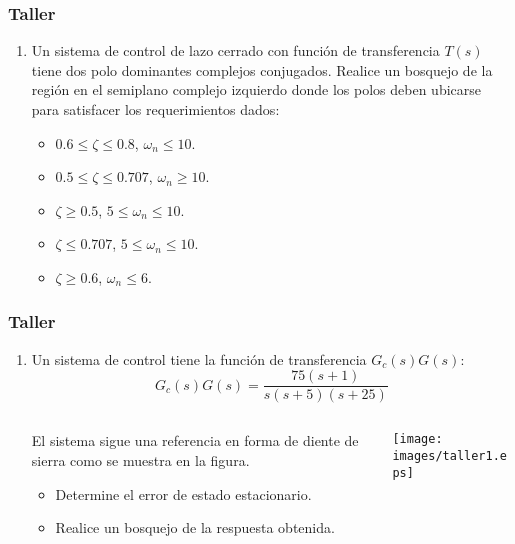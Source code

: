\documentclass[aspectratio=169,handout]{beamer}
\theoremstyle{definition}
\theoremstyle{plain}
\theoremstyle{remark}
\newcounter{saveenumi}
\newcommand{\seti}{\setcounter{saveenumi}{\value{enumi}}}
\newcommand{\conti}{\setcounter{enumi}{\value{saveenumi}}}
\begin{document}
\begin{frame}[c]\frametitle{Taller}
	\begin{enumerate}
		\conti
		\item Un sistema de control de lazo cerrado con función de transferencia $T(s)$ tiene dos polo dominantes complejos conjugados. Realice un bosquejo de la región en el semiplano complejo izquierdo donde los polos deben ubicarse para satisfacer los requerimientos dados:
		\begin{itemize}
			\item $0.6 \leq \zeta \leq 0.8$, $\omega_n \leq 10$.
			\item $0.5 \leq \zeta \leq 0.707$, $\omega_n \geq 10$.
			\item $\zeta \geq 0.5$, $5 \leq \omega_n \leq 10$.
			\item $\zeta \leq 0.707$, $5 \leq \omega_n \leq 10$.
			\item $\zeta \geq 0.6$, $\omega_n \leq 6$.
		\end{itemize}
		\seti
	\end{enumerate}
\end{frame}

\begin{frame}[c]\frametitle{Taller}
\begin{enumerate}
	\conti
	\item Un sistema de control tiene la función de transferencia $G_c(s)G(s)$:
	\begin{equation*}
		G_c(s)G(s) = \frac{75(s+1)}{s(s+5)(s+25)}
	\end{equation*}
	\begin{columns}
	\begin{column}{0.5\textwidth}
	El sistema sigue una referencia en forma de diente de sierra como se muestra en la figura.
	\begin{itemize}
		\item Determine el error de estado estacionario.
		\item Realice un bosquejo de la respuesta obtenida.
	\end{itemize}
	\end{column}	
	\begin{column}{0.5\textwidth}
		\centering
		\texttt{[image: images/taller1.eps]}
	\end{column}	
	\end{columns}
	\seti
\end{enumerate}
\end{frame}
\end{document}
